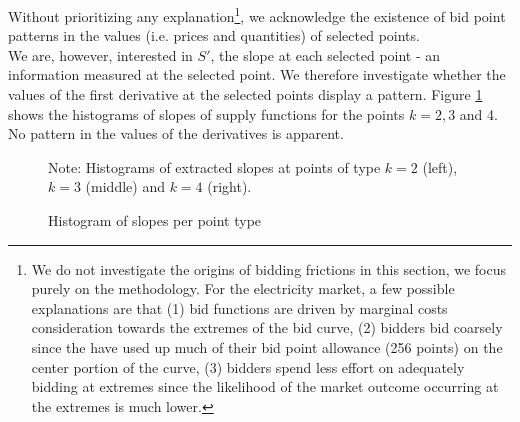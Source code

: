 Without prioritizing any explanation\footnote{ We do not investigate the origins of bidding frictions in this section, we focus purely on  the methodology. For the electricity market, a few possible explanations are that (1) bid functions are driven by marginal costs consideration towards the extremes of the bid curve, (2) bidders bid coarsely since the have used up much of their bid point allowance (256 points) on the center portion of the curve, (3) bidders spend less effort on adequately bidding at extremes since the likelihood of the market outcome occurring at the extremes is much lower. }, we acknowledge the existence of bid point patterns in the values (i.e. prices and quantities) of selected points. \\

We are, however, interested in $S'$, the slope at each selected point - an information measured at the selected point. We therefore investigate whether the values of the first derivative at the selected points display a pattern. Figure \ref{histpattern1} shows the histograms of slopes of supply functions for the points $k=2,3$ and 4. No pattern in the values of the derivatives is apparent. \\

\begin{figure}[!ht]
\begin{center}
\caption{Histogram of slopes per point type}
\label{histpattern1}
\end{center}
{ \small Note: Histograms of extracted slopes at points of type $k=2$ (left), $k=3$ (middle) and $k=4$ (right).} 
\end{figure}


